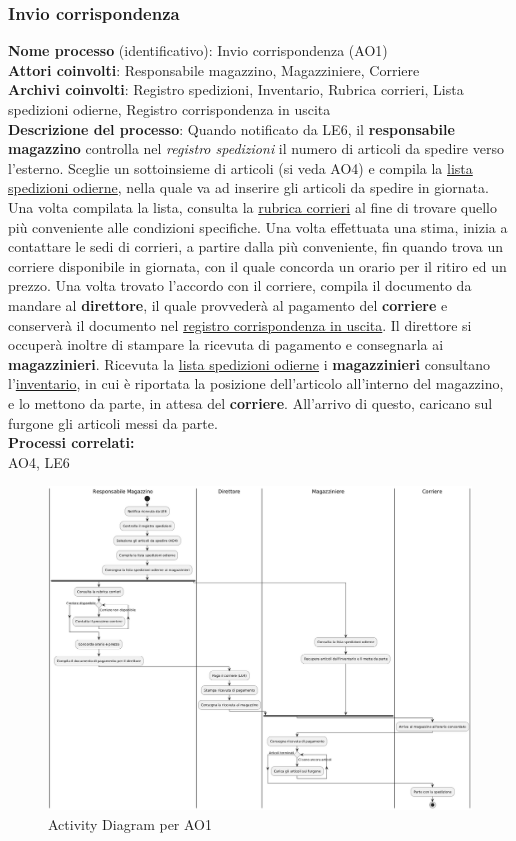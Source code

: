 \documentclass[a4paper,12pt]{article}
\begin{document}
\newpage
\subsubsection{Invio corrispondenza}
\textbf{Nome processo} (identificativo): Invio corrispondenza (AO1) \\
\textbf{Attori coinvolti}: Responsabile magazzino, Magazziniere, Corriere \\
\textbf{Archivi coinvolti}: Registro spedizioni, Inventario, Rubrica corrieri, Lista spedizioni odierne, Registro corrispondenza in uscita \\
\textbf{Descrizione del processo}: Quando notificato da LE6, il \textbf{responsabile magazzino} controlla nel \textit{registro spedizioni} il numero di articoli
da spedire verso l'esterno. Sceglie un sottoinsieme di articoli (si veda AO4) e compila la \underline{lista spedizioni odierne}, 
nella quale va ad inserire gli articoli da spedire in giornata. Una volta compilata la lista, consulta la \underline{rubrica corrieri} al fine
di trovare quello più conveniente alle condizioni specifiche. Una volta effettuata una stima, inizia a contattare le sedi di corrieri, a partire dalla più 
conveniente, fin quando trova un corriere disponibile in giornata, con il quale concorda un orario per il ritiro ed un prezzo.
Una volta trovato l'accordo con il corriere, compila il documento da mandare al \textbf{direttore}, il quale provvederà al pagamento del \textbf{corriere} 
e conserverà il documento nel \underline{registro corrispondenza in uscita}. Il direttore si occuperà inoltre di stampare la ricevuta di pagamento e 
consegnarla ai \textbf{magazzinieri}.
Ricevuta la \underline{lista spedizioni odierne} i \textbf{magazzinieri} consultano l'\underline{inventario}, in cui è riportata la posizione dell'articolo
all'interno del magazzino, e lo mettono da parte, in attesa del \textbf{corriere}. All'arrivo di questo, caricano sul furgone gli articoli messi da parte. \\
\textbf{Processi correlati:}\\AO4, LE6\\
\begin{figure}[H]
  \centering
  \includegraphics[width=0.8\linewidth]{assets/activitydiagram_AO1.png}
	\caption{Activity Diagram per AO1}
\end{figure}
\end{document}
